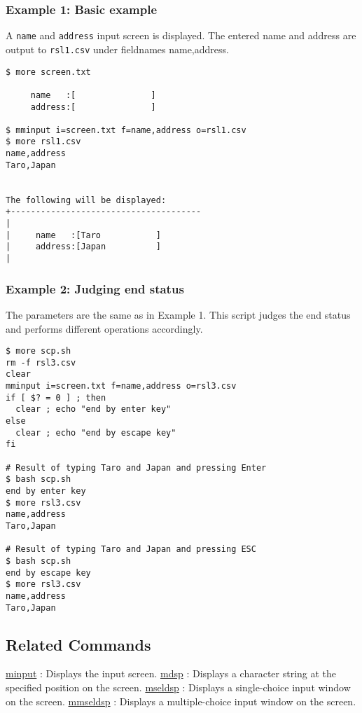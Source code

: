 \subsubsection*{Example 1: Basic example}
A \verb|name| and \verb|address| input screen is displayed. The entered name and address are output to \verb|rsl1.csv| under fieldnames name,address.

\begin{Verbatim}[baselinestretch=0.7,frame=single]
$ more screen.txt

     name   :[               ]
     address:[               ]

$ mminput i=screen.txt f=name,address o=rsl1.csv
$ more rsl1.csv
name,address
Taro,Japan


The following will be displayed:
+--------------------------------------
|
|     name   :[Taro           ]
|     address:[Japan          ]
|
\end{Verbatim}

\subsubsection*{Example 2: Judging end status}
The parameters are the same as in Example 1. This script judges the end status and performs different operations accordingly.

\begin{Verbatim}[baselinestretch=0.7,frame=single]
$ more scp.sh
rm -f rsl3.csv
clear
mminput i=screen.txt f=name,address o=rsl3.csv
if [ $? = 0 ] ; then
  clear ; echo "end by enter key"
else
  clear ; echo "end by escape key"
fi

# Result of typing Taro and Japan and pressing Enter
$ bash scp.sh
end by enter key
$ more rsl3.csv
name,address
Taro,Japan

# Result of typing Taro and Japan and pressing ESC
$ bash scp.sh
end by escape key
$ more rsl3.csv
name,address
Taro,Japan
\end{Verbatim}

\subsection*{Related Commands}
\hyperref[sect:minput] {minput} : Displays the input screen.
\hyperref[sect:mdsp] {mdsp} : Displays a character string at the specified position on the screen.
\hyperref[sect:mseldsp] {mseldsp} : Displays a single-choice input window on the screen.
\hyperref[sect:mmseldsp] {mmseldsp} : Displays a multiple-choice input window on the screen.

%
